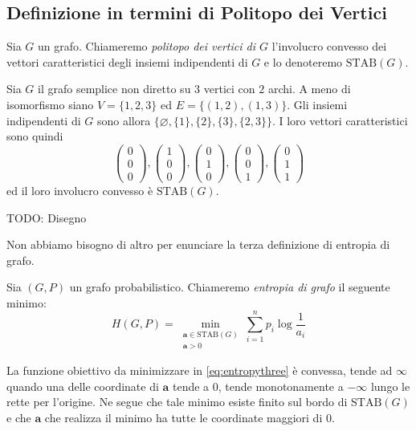 \subsection{Definizione in termini di Politopo dei Vertici} 
\begin{definition}
	Sia \(G\) un grafo. Chiameremo \emph{politopo dei vertici di \(G\)} l'involucro convesso dei vettori caratteristici degli insiemi indipendenti di \(G\) e lo denoteremo \(\text{STAB}(G)\). 
\end{definition}
\begin{example}
	Sia \(G\) il grafo semplice non diretto su \(3\) vertici con \(2\) archi. A meno di isomorfismo siano \(V=\{1,2,3\}\) ed \(E=\{(1,2),(1,3)\}\). Gli insiemi indipendenti di \(G\) sono allora \(\{\varnothing , \{1\}, \{2\}, \{3\}, \{2,3\}\}\). I loro vettori caratteristici sono quindi
	\[ 
	\begin{pmatrix}
		0\\0\\0 
	\end{pmatrix}
	, 
	\begin{pmatrix}
		1\\0\\0 
	\end{pmatrix}
	, 
	\begin{pmatrix}
		0\\1\\0 
	\end{pmatrix}
	, 
	\begin{pmatrix}
		0\\0\\1 
	\end{pmatrix}
	, 
	\begin{pmatrix}
		0\\1\\1 
	\end{pmatrix}
	\]
	ed il loro involucro convesso è \(\text{STAB}(G)\).
	
  TODO: Disegno 
\end{example}

Non abbiamo bisogno di altro per enunciare la terza definizione di entropia di grafo. 
\begin{definition}
	Sia \((G,P)\) un grafo probabilistico. Chiameremo \emph{entropia di grafo} il seguente minimo: 
	\begin{equation}
		\label{eq:entropythree} H(G,P)=\min_{\substack{\mathbf{a}\in \text{STAB}(G) \\
		\mathbf{a} > 0}} \sum_{i=1}^n p_i \log{\frac{1}{a_i}} 
	\end{equation}
\end{definition}
\begin{remark}
	La funzione obiettivo da minimizzare in \eqref{eq:entropythree} è convessa, tende ad \(\infty\) quando una delle coordinate di \(\mathbf{a}\) tende a \(0\), tende monotonamente a \(-\infty\) lungo le rette per l'origine. Ne segue che tale minimo esiste finito sul bordo di \(\text{STAB}(G)\) e che \(\mathbf{a}\) che realizza il minimo ha tutte le coordinate maggiori di \(0\). 
\end{remark}

